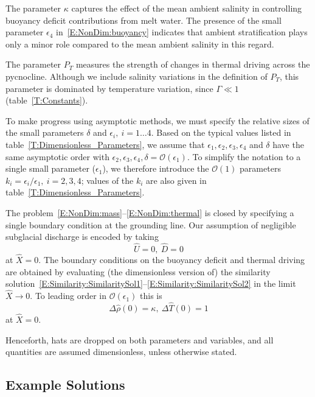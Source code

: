 \documentclass{jfm}
\newcommand{\order}[1]{\mathcal{O}(#1)}
\newcommand{\epsone}{\epsilon_{1}} %
\newcommand{\epstwo}{\epsilon_{2}} %
\newcommand{\epsthree}{\epsilon_{3}} %
\newcommand{\epsfour}{\epsilon_{4}}
\newcommand{\lt}{\delta} %
\newcommand{\Pt}{\textit{P}_T}
\begin{document}
The parameter $\kappa$ captures the effect of the mean ambient salinity in controlling buoyancy deficit contributions from melt water.  The presence of the small parameter $\epsfour$ in~\eqref{E:NonDim:buoyancy} indicates that ambient stratification plays only a minor role compared to the mean ambient salinity in this regard. 

The parameter $\Pt$ measures the strength of changes in thermal driving across the pycnocline. Although we include salinity variations in the definition of $\Pt$, this parameter is dominated by temperature variation, since $\Gamma \ll 1$ (table~\ref{T:Constants}).

To make progress using asymptotic methods, we must specify the relative sizes of the small parameters $\lt$ and $\epsilon_i, ~i = 1\dots4$. Based on the typical values listed in table~\ref{T:Dimensionless_Parameters}, we assume that $\epsone, \epstwo, \epsthree, \epsfour$ and $\lt$ have the same asymptotic order with $\epstwo, \epsthree, \epsfour, \lt = \order{\epsone}$. To simplify the notation to a single small parameter ($\epsone$), we therefore introduce the $\order{1}$ parameters $k_i =\epsilon_i/ \epsone,~i = 2,3,4$; values of the $k_i$ are also given in table~\ref{T:Dimensionless_Parameters}.

The problem~\eqref{E:NonDim:mass}--\eqref{E:NonDim:thermal} is closed by specifying a single boundary condition at the grounding line. Our assumption of negligible subglacial discharge is encoded by taking
\begin{equation}\label{E:NonDim:IC1}
\hat{U} =0,~\hat{D} = 0
\end{equation}
at $\hat{X} = 0$. The boundary conditions on the buoyancy deficit and thermal driving are obtained by evaluating (the dimensionless version of) the similarity solution~\eqref{E:Similarity:SimilaritySol1}--\eqref{E:Similarity:SimilaritySol2} in the limit $\hat{X} \to 0$. To leading order in $\order{\epsone}$ this is
\begin{equation}\label{E:NonDim:IC2}
  \Delta\hat{\rho}(0) = \kappa,~\Delta \hat{T}(0) = 1  
\end{equation}
at $\hat{X} = 0$.

Henceforth, hats are dropped on both parameters and variables, and all quantities are assumed dimensionless, unless otherwise stated.

\subsection{Example Solutions}\label{S:ExampleSolutions}
\end{document}
